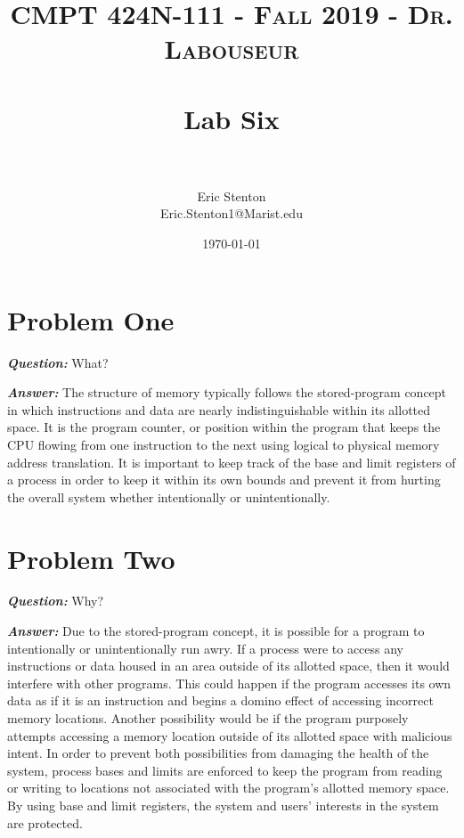 \documentclass[letterpaper, 10pt,DIV=13]{scrartcl}
\title{	
   \normalfont \normalsize 
   \textsc{CMPT 424N-111 - Fall 2019 - Dr. Labouseur} \\[10pt] %
   \horrule{0.5pt} \\[0.25cm] 	%
   \huge Lab Six  \\     	    %
   \horrule{0.5pt} \\[0.25cm] 	%
}
\author{Eric Stenton \\ \normalsize Eric.Stenton1@Marist.edu}
\date{\normalsize\today} 	%
\numberwithin{equation}{section} %
\numberwithin{figure}{section} %
\numberwithin{table}{section} %
\begin{document}
\maketitle %

\section{Problem One}
 
\textbf{\emph{Question:}}
What?

\textbf{\emph{Answer:}}
The structure of memory typically follows the stored-program concept in which instructions and data are nearly indistinguishable within its allotted space. It is the program counter, or position within the program that keeps the CPU flowing from one instruction to the next using logical to physical memory address translation. It is important to keep track of the base and limit registers of a process in order to keep it within its own bounds and prevent it from hurting the overall system whether intentionally or unintentionally.


\section{Problem Two}

\textbf{\emph{Question:}}
Why?

\textbf{\emph{Answer:}}
Due to the stored-program concept, it is possible for a program to intentionally or unintentionally run awry. If a process were to access any instructions or data housed in an area outside of its allotted space, then it would interfere with other programs. This could happen if the program accesses its own data as if it is an instruction and begins a domino effect of accessing incorrect memory locations. Another possibility would be if the program purposely attempts accessing a memory location outside of its allotted space with malicious intent. In order to prevent both possibilities from damaging the health of the system, process bases and limits are enforced to keep the program from reading or writing to locations not associated with the program's allotted memory space. By using base and limit registers, the system and users' interests in the system are protected. 



\end{document}
